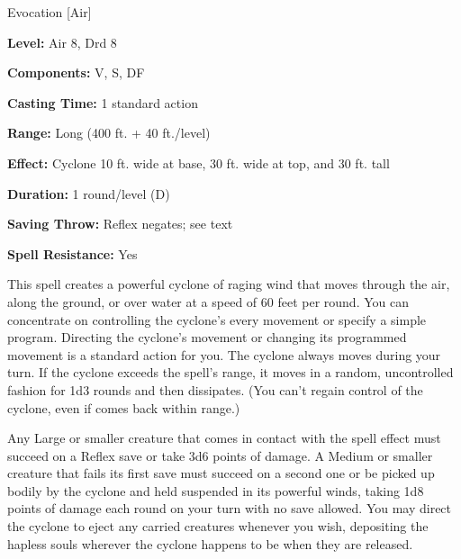 
Evocation [Air]

\textbf{Level:} Air 8, Drd 8

\textbf{Components:} V, S, DF

\textbf{Casting Time:} 1 standard action

\textbf{Range:} Long (400 ft. + 40 ft./level)

\textbf{Effect:} Cyclone 10 ft. wide at base, 30 ft. wide at top, and 30 ft. tall

\textbf{Duration:} 1 round/level (D)

\textbf{Saving Throw:} Reflex negates; see text

\textbf{Spell Resistance:} Yes

This spell creates a powerful cyclone of raging wind that moves through the air, 
along the ground, or over water at a speed of 60 feet per round. You can concentrate 
on controlling the cyclone's every movement or specify a simple program. Directing 
the cyclone's movement or changing its programmed movement is a standard action 
for you. The cyclone always moves during your turn. If the cyclone exceeds the 
spell's range, it moves in a random, uncontrolled fashion for 1d3 rounds and then 
dissipates. (You can't regain control of the cyclone, even if comes back within 
range.)

Any Large or smaller creature that comes in contact with the spell effect must 
succeed on a Reflex save or take 3d6 points of damage. A Medium or smaller creature 
that fails its first save must succeed on a second one or be picked up bodily by 
the cyclone and held suspended in its powerful winds, taking 1d8 points of damage 
each round on your turn with no save allowed. You may direct the cyclone to eject 
any carried creatures whenever you wish, depositing the hapless souls wherever 
the cyclone happens to be when they are released.

